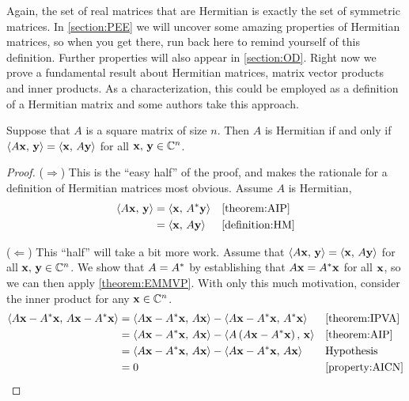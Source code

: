 \documentclass{ximera}
\begin{document}
Again, the set of real matrices that are Hermitian is exactly the set
of symmetric matrices.  In \ref{section:PEE} we will uncover some
amazing properties of Hermitian matrices, so when you get there, run
back here to remind yourself of this definition.  Further properties
will also appear in \ref{section:OD}.  Right now we prove a
fundamental result about Hermitian matrices, matrix vector products
and inner products.  As a characterization, this could be employed as
a definition of a Hermitian matrix and some authors take this
approach.

\begin{theorem}
  \label{theorem:HMIP}

  Suppose that $A$ is a square matrix of size $n$.  Then $A$ is
  Hermitian if and only if
  $\left\langle A\mathbf{x},\,\mathbf{y}\right\rangle=\left\langle\mathbf{x},\,A\mathbf{y}\right\rangle$
  for all $\mathbf{x},\,\mathbf{y}\in\mathbb{C}^{n}$.

\begin{proof}
  ($\Rightarrow$) This is the ``easy half'' of the proof, and makes
  the rationale for a definition of Hermitian matrices most obvious.
  Assume $A$ is Hermitian,
  \begin{align*}
    \left\langle A\mathbf{x},\,\mathbf{y}\right\rangle
    &=\left\langle\mathbf{x},\,A^\ast\mathbf{y}\right\rangle&&\ref{theorem:AIP}\\
    &=\left\langle\mathbf{x},\,A\mathbf{y}\right\rangle&&\ref{definition:HM}\\
  \end{align*}

  ($\Leftarrow$) This ``half'' will take a bit more work.  Assume that
  $\left\langle A\mathbf{x},\,\mathbf{y}\right\rangle=\left\langle\mathbf{x},\,A\mathbf{y}\right\rangle$
  for all $\mathbf{x},\,\mathbf{y}\in\mathbb{C}^{n}$.  We show that
  $A=A^\ast$ by establishing that $A\mathbf{x}=A^\ast\mathbf{x}$
  for all $\mathbf{x}$, so we can then apply \ref{theorem:EMMVP}.  With
  only this much motivation, consider the inner product for any
  $\mathbf{x}\in\mathbb{C}^{n}$.
  \begin{align*}
    \left\langle A\mathbf{x}-A^\ast\mathbf{x},\,A\mathbf{x}-A^\ast\mathbf{x}\right\rangle
    &=
      \left\langle A\mathbf{x}-A^\ast\mathbf{x},\,A\mathbf{x}\right\rangle-
      \left\langle A\mathbf{x}-A^\ast\mathbf{x},\,A^\ast\mathbf{x}\right\rangle
    &&\ref{theorem:IPVA}\\
    &=
      \left\langle A\mathbf{x}-A^\ast\mathbf{x},\,A\mathbf{x}\right\rangle-
      \left\langle A\left(A\mathbf{x}-A^\ast\mathbf{x}\right),\,\mathbf{x}\right\rangle
    &&\ref{theorem:AIP}\\
    &=
      \left\langle A\mathbf{x}-A^\ast\mathbf{x},\,A\mathbf{x}\right\rangle-
      \left\langle A\mathbf{x}-A^\ast\mathbf{x},\,A\mathbf{x}\right\rangle
    &&\text{Hypothesis}\\
    &
      =0
    &&\ref{property:AICN}
  \end{align*}


\end{proof}
\end{theorem}
\end{document}
